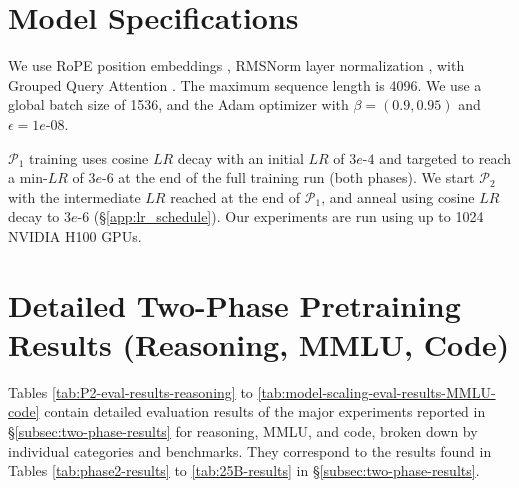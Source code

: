 \documentclass[11pt]{article}
\newcommand{\phaseone}{$\mathcal{P}_1$\xspace}
\newcommand{\phasetwo}{$\mathcal{P}_2$\xspace}
\begin{document}


%


\newpage
\appendix

\section{Model Specifications}
\label{app:detailed_model_specs}

We use RoPE position embeddings \cite{rope-paper}, RMSNorm layer normalization \cite{RMSNorm}, with Grouped Query Attention \cite{ainslie-etal-2023-gqa}. The maximum sequence length is 4096. We use a global batch size of 1536, 
and the Adam optimizer \cite{kingma2017adammethodstochasticoptimization} with $\beta=(0.9,0.95)$ and $\epsilon=1e$-$08$. 

\phaseone training uses cosine $LR$ decay with an initial $LR$ of $3e$-$4$ and targeted to reach a min-$LR$ of $3e$-$6$ at the end of the full training run (both phases). 
We start \phasetwo with the intermediate $LR$ reached at the end of \phaseone, and anneal using cosine $LR$ decay to $3e$-$6$ (\S\ref{app:lr_schedule}). 
Our experiments are run using up to 1024 NVIDIA H100 GPUs.

\section{Detailed Two-Phase Pretraining Results (Reasoning, MMLU, Code)}
\label{app:detailed_exp_results}

Tables \ref{tab:P2-eval-results-reasoning} to \ref{tab:model-scaling-eval-results-MMLU-code} contain detailed evaluation results of the major experiments reported in \S\ref{subsec:two-phase-results} for reasoning, MMLU, and code, broken down by individual categories and benchmarks. They correspond to the results found in Tables \ref{tab:phase2-results} to \ref{tab:25B-results} in \S\ref{subsec:two-phase-results}.
\end{document}
